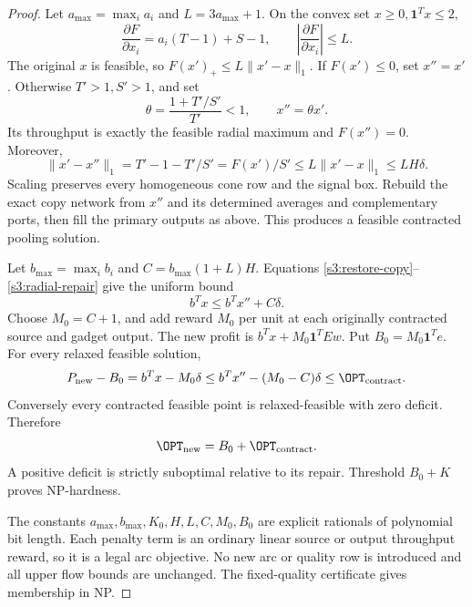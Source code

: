 \begin{proof}
Let $a_{\max}=\max_i a_i$ and $L=3a_{\max}+1$. On the convex set
$x\ge0,\mathbf1^Tx\le2$,
\[
 \frac{\partial F}{\partial x_i}=a_i(T-1)+S-1,
 \qquad \left|\frac{\partial F}{\partial x_i}\right|\le L.
\]
The original $x$ is feasible, so $F(x')_+\le L\|x'-x\|_1$.
If $F(x')\le0$, set $x''=x'$. Otherwise $T'>1,S'>1$, and set
\[
 \theta=\frac{1+T'/S'}{T'}<1,\qquad x''=\theta x'.
\]
Its throughput is exactly the feasible radial maximum and $F(x'')=0$.
Moreover,
\begin{equation}
 \|x'-x''\|_1=T'-1-T'/S'=F(x')/S'
 \le L\|x'-x\|_1\le LH\delta.\label{s3:radial-repair}
\end{equation}
Scaling preserves every homogeneous cone row and the signal box.
Rebuild the exact copy network from $x''$ and its determined averages
and complementary ports, then fill the primary outputs as above.
This produces a feasible contracted pooling solution.

Let $b_{\max}=\max_i b_i$ and $C=b_{\max}(1+L)H$. Equations
\eqref{s3:restore-copy}--\eqref{s3:radial-repair} give the uniform bound
\begin{equation}
 b^Tx\le b^Tx''+C\delta.\label{s3:profit-repair}
\end{equation}
Choose $M_0=C+1$, and add reward $M_0$ per unit at each originally
contracted source and gadget output. The new profit is
$b^Tx+M_0\mathbf1^TEw$. Put $B_0=M_0\mathbf1^Te$.
For every relaxed feasible solution,
\[
 P_{\rm new}-B_0=b^Tx-M_0\delta
 \le b^Tx''-(M_0-C)\delta\le\OPT_{\rm contract}.
\]
Conversely every contracted feasible point is relaxed-feasible with
zero deficit. Therefore
\begin{equation}
 \OPT_{\rm new}=B_0+\OPT_{\rm contract}.\label{s3:penalty-value}
\end{equation}
A positive deficit is strictly suboptimal relative to its repair.
Threshold $B_0+K$ proves NP-hardness.

The constants $a_{\max},b_{\max},K_0,H,L,C,M_0,B_0$ are explicit
rationals of polynomial bit length. Each penalty term is an ordinary
linear source or output throughput reward, so it is a legal arc
objective. No new arc or quality row is introduced and all upper flow
bounds are unchanged. The fixed-quality certificate gives membership
in NP.


\end{proof}
